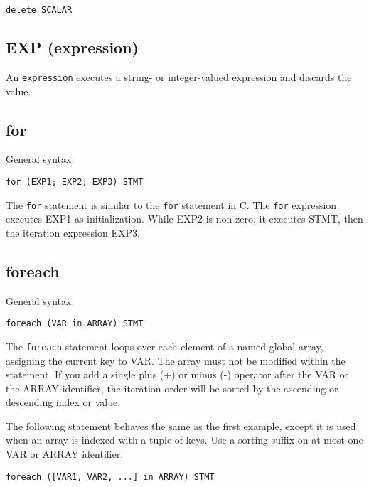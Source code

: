 \documentclass[twoside,english]{article}
\newenvironment{vindent}
{\begin{list}{}{\setlength{\listparindent}{6pt}}
\item[]}
{\end{list}}
\begin{document}
\begin{vindent}
\begin{verbatim}
delete SCALAR
\end{verbatim}
\end{vindent}

\subsection{EXP (expression)}
An \texttt{expression} executes a string- or integer-valued expression and
discards the value.


\subsection{for}
General syntax:
\begin{vindent}
\begin{verbatim}
for (EXP1; EXP2; EXP3) STMT
\end{verbatim}
\end{vindent}
The \texttt{for} statement is similar to the \texttt{for} statement in C.
The \texttt{for} expression executes EXP1 as initialization. While EXP2 is
non-zero, it executes STMT, then the iteration expression EXP3.

\subsection{foreach\label{sub:foreach}}
General syntax:
\begin{vindent}
\begin{verbatim}
foreach (VAR in ARRAY) STMT
\end{verbatim}
\end{vindent}
The \texttt{foreach} statement loops over each element of a named global array, assigning
the current key to VAR. The array must not be modified within the statement.
If you add a single plus (+) or minus (-) operator after the VAR or the ARRAY
identifier, the iteration order will be sorted by the ascending or descending
index or value.

The following statement behaves the same as the first example, except it
is used when an array is indexed with a tuple of keys.  Use a sorting suffix
on at most one VAR or ARRAY identifier.

\begin{vindent}
\begin{verbatim}
foreach ([VAR1, VAR2, ...] in ARRAY) STMT
\end{verbatim}
\end{vindent}
\end{document}
